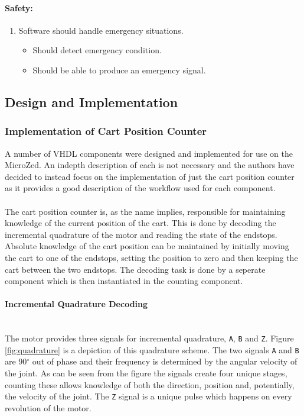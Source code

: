 \paragraph{Safety:}
\begin{enumerate}[resume]
	\item Software should handle emergency situations.
	\label{enum:software_should_handle_emergency}
	\begin{itemize}
		\item Should detect emergency condition.
		\item Should be able to produce an emergency signal.
	\end{itemize}
\end{enumerate}

\subsection{Design and Implementation} %
\label{sub:implementation}
\subsubsection{Implementation of Cart Position Counter} %
\label{ssub:vhdl_components}
A number of VHDL components were designed and implemented for use on the MicroZed.
An indepth description of each is not necessary and the authors have decided to instead focus on the implementation of just the cart position counter as it provides a good description of the workflow used for each component.
\\~\\
The cart position counter is, as the name implies, responsible for maintaining knowledge of the current position of the cart.
This is done by decoding the incremental quadrature of the motor and reading the state of the endstops.
Absolute knowledge of the cart position can be maintained by initially moving the cart to one of the endstops, setting the position to zero and then keeping the cart between the two endstops.
The decoding task is done by a seperate component which is then instantiated in the counting component.

\paragraph{Incremental Quadrature Decoding}~\\ %
\label{par:incremental_quadrature}
The motor provides three signals for incremental quadrature, \texttt{A}, \texttt{B} and \texttt{Z}. 
Figure \ref{fig:quadrature} is a depiction of this quadrature scheme.
The two signals \texttt{A} and \texttt{B} are 90$^\circ$ out of phase and their frequency is determined by the angular velocity of the joint.
As can be seen from the figure the signals create four unique stages, counting these allows knowledge of both the direction, position and, potentially, the velocity of the joint.
The \texttt{Z} signal is a unique pulse which happens on every revolution of the motor.

